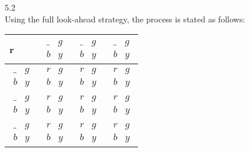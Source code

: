 \documentclass[a4paper]{article}
\begin{document}
5.2\\
Using the full look-ahead strategy, the process is stated as follows:\\

\begin{tabular}{|l|l|l|l|}
\hline
r & $\begin{matrix}   \_ & g \\   b & y  \end{matrix}$ & $\begin{matrix}   \_ & g \\   b & y  \end{matrix}$ & $\begin{matrix}   \_ & g \\   b & y  \end{matrix}$ \\ \hline
$\begin{matrix}   \_ & g \\   b & y  \end{matrix}$ & $\begin{matrix}   r & g \\   b & y  \end{matrix}$ & $\begin{matrix}   r & g \\   b & y  \end{matrix}$ & $\begin{matrix}   r & g \\   b & y  \end{matrix}$ \\ \hline
$\begin{matrix}   \_ & g \\   b & y  \end{matrix}$ & $\begin{matrix}   r & g \\   b & y  \end{matrix}$ & $\begin{matrix}   r & g \\   b & y  \end{matrix}$ & $\begin{matrix}   r & g \\   b & y  \end{matrix}$ \\ \hline
$\begin{matrix}   \_ & g \\   b & y  \end{matrix}$ & $\begin{matrix}   r & g \\   b & y  \end{matrix}$ & $\begin{matrix}   r & g \\   b & y  \end{matrix}$ & $\begin{matrix}   r & g \\   b & y  \end{matrix}$ \\ \hline
\end{tabular}\\\\
\end{document}
